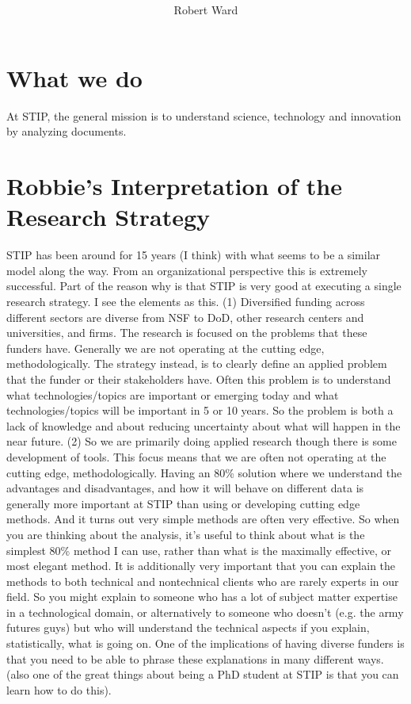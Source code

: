 \documentclass[11pt,letterpaper]{article} %
\let\footnote=\endnote
\begin{document}
\title{\textbf{\papertitle}}
\author[]{Robert Ward\footnote{Email: \href{mailto:\myemail}{\myemail}}}
\affil[]{\myaffiliation}


\maketitle\thispagestyle{empty}

\section{What we do}
At STIP, the general mission is to understand science, technology and innovation by analyzing documents.





\section{Robbie's Interpretation of the Research Strategy}
STIP has been around for 15 years (I think) with what seems to be a similar model along the way.  From an organizational perspective this is extremely successful.  Part of the reason why is that STIP is very good at executing a single research strategy.  I see the elements as this.  (1) Diversified funding across different sectors are diverse from NSF to DoD, other research centers and universities, and firms.  The research is focused on the problems that these funders have.  Generally we are not operating at the cutting edge, methodologically.  The strategy instead, is to clearly define an applied problem that the funder or their stakeholders have.  Often this problem is to understand what technologies/topics are important or emerging today and what technologies/topics will be important in 5 or 10 years.  So the problem is both a lack of knowledge and about reducing uncertainty about what will happen in the near future.  (2) So we are primarily doing applied research though there is some development of tools.  This focus means that we are often not operating at the cutting edge, methodologically.  Having an 80\% solution where we understand the advantages and disadvantages, and how it will behave on different data is generally more important at STIP than using or developing cutting edge methods.  And it turns out very simple methods are often very effective.  So when you are thinking about the analysis, it's useful to think about what is the simplest 80\% method I can use, rather than what is the maximally effective, or most elegant method.  It is additionally very important that you can explain the methods to both technical and nontechnical clients who are rarely experts in our field.  So you might explain to someone who has a lot of subject matter expertise in a technological domain, or alternatively to someone who doesn't (e.g. the army futures guys) but who will understand the technical aspects if you explain, statistically, what is going on.  One of the implications of having diverse funders is that you need to be able to phrase these explanations in many different ways.  (also one of the great things about being a PhD student at STIP is that you can learn how to do this).
\end{document}
